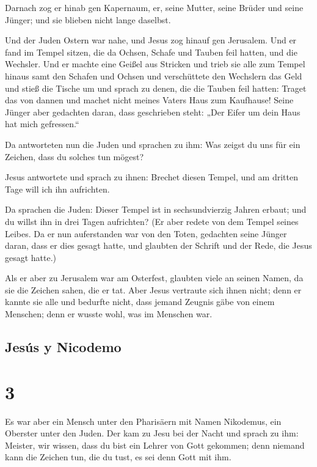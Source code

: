  Darnach zog er hinab gen Kapernaum, er, seine Mutter,
seine Brüder und seine Jünger; und sie blieben nicht lange daselbst.

 Und der Juden Ostern war nahe, und Jesus zog hinauf gen
Jerusalem.  Und er fand im Tempel sitzen, die da Ochsen,
Schafe und Tauben feil hatten, und die Wechsler.  Und er
machte eine Geißel aus Stricken und trieb sie alle zum Tempel hinaus
samt den Schafen und Ochsen und verschüttete den Wechslern das Geld und
stieß die Tische um  und sprach zu denen, die die Tauben
feil hatten: Traget das von dannen und machet nicht meines Vaters Haus
zum Kaufhause!  Seine Jünger aber gedachten daran, dass
geschrieben steht: „Der Eifer um dein Haus hat mich gefressen.``

 Da antworteten nun die Juden und sprachen zu ihm: Was
zeigst du uns für ein Zeichen, dass du solches tun mögest?

 Jesus antwortete und sprach zu ihnen: Brechet diesen
Tempel, und am dritten Tage will ich ihn aufrichten.

 Da sprachen die Juden: Dieser Tempel ist in
sechsundvierzig Jahren erbaut; und du willst ihn in drei Tagen
aufrichten?  (Er aber redete von dem Tempel seines
Leibes.  Da er nun auferstanden war von den Toten,
gedachten seine Jünger daran, dass er dies gesagt hatte, und glaubten
der Schrift und der Rede, die Jesus gesagt hatte.)

 Als er aber zu Jerusalem war am Osterfest, glaubten
viele an seinen Namen, da sie die Zeichen sahen, die er tat.
 Aber Jesus vertraute sich ihnen nicht; denn er kannte
sie alle  und bedurfte nicht, dass jemand Zeugnis gäbe
von einem Menschen; denn er wusste wohl, was im Menschen war.

\hypertarget{jesuxfas-y-nicodemo}{%
\subsection{Jesús y Nicodemo}\label{jesuxfas-y-nicodemo}}

\hypertarget{section-2}{%
\section{3}\label{section-2}}

 Es war aber ein Mensch unter den Pharisäern mit Namen
Nikodemus, ein Oberster unter den Juden.  Der kam zu Jesu
bei der Nacht und sprach zu ihm: Meister, wir wissen, dass du bist ein
Lehrer von Gott gekommen; denn niemand kann die Zeichen tun, die du
tust, es sei denn Gott mit ihm.

